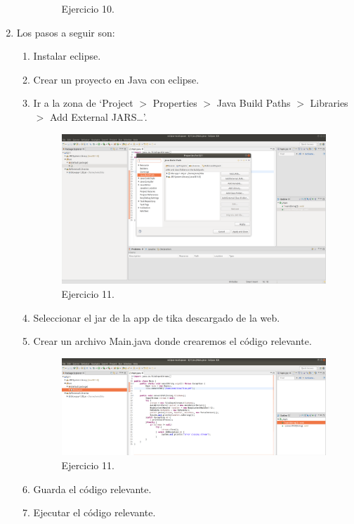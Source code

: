 \documentclass{article}
\begin{document}
\begin{enumerate}
\begin{enumerate}
\begin{figure}[H]
                \caption{Ejercicio 10.}
                \end{figure}
                
        \end{enumerate}
    \item Los pasos a seguir son:
        \begin{enumerate}
            \item Instalar eclipse.
            \item Crear un proyecto en Java con eclipse.
            \item Ir a la zona de `Project $>$ Properties $>$ Java Build Paths $>$ Libraries $>$ Add External JARS\ldots'.
                \begin{figure}[H]
                \centering
                \includegraphics[width=0.7\linewidth]{./ej18}
                \caption{Ejercicio 11.}
                \end{figure}
            \item Seleccionar el jar de la app de tika descargado de la web.
            \item Crear un archivo Main.java donde crearemos el código relevante.
                \begin{figure}[H]
                \centering
                \includegraphics[width=0.7\linewidth]{./ej19}
                \caption{Ejercicio 11.}
                \end{figure}
            \item Guarda el código relevante.
            \item Ejecutar el código relevante.
                \begin{figure}[H]

\end{figure}
\end{enumerate}
\end{enumerate}
\end{document}
